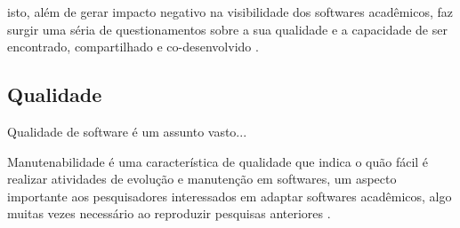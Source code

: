 isto, além de gerar
impacto negativo na visibilidade dos softwares acadêmicos, faz surgir uma séria
de questionamentos sobre a sua qualidade e a capacidade de ser encontrado,
compartilhado e co-desenvolvido \cite{howison2013, katz2014transitive}
\cite{howison2016software}.

\subsection{Qualidade}

%
%
%
%

%

Qualidade de software é um assunto vasto...

Manutenabilidade é uma característica de qualidade que indica o quão fácil é
realizar atividades de evolução e manutenção em softwares, um aspecto
importante aos pesquisadores interessados em adaptar softwares acadêmicos, algo
muitas vezes necessário ao reproduzir pesquisas anteriores \cite{Peng2011}.

